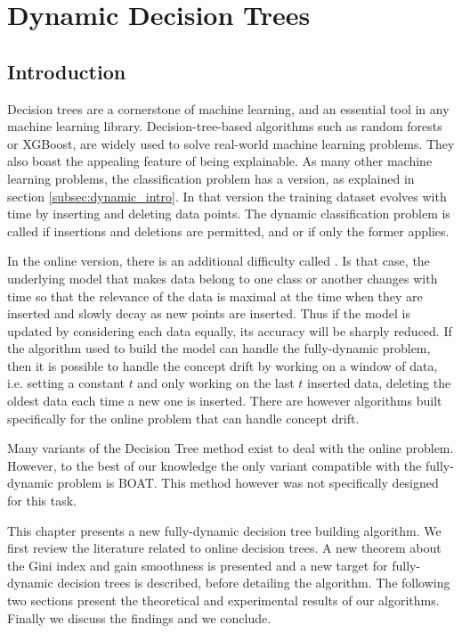 \chapter{Dynamic Decision Trees}
\section{Introduction}
Decision trees are a cornerstone of machine learning, and an essential tool in any machine learning library. Decision-tree-based algorithms such as random forests or XGBoost, are widely used to solve real-world machine learning problems. They also boast the appealing feature of being explainable.
As many other machine learning problems, the classification problem has a  version, as explained in section \ref{subsec:dynamic_intro}. In that version the training dataset evolves with time by inserting and deleting data points. The dynamic classification problem is called  if insertions and deletions are permitted, and  or  if only the former applies.

In the online version, there is an additional difficulty called . Is that case, the underlying model that makes data belong to one class or another changes with time so that the relevance of the data is maximal at the time when they are inserted and slowly decay as new points are inserted. Thus if the model is updated by considering each data equally, its accuracy will be sharply reduced. If the algorithm used to build the model can handle the fully-dynamic problem, then it is possible to handle the concept drift by working on a window of data, i.e. setting a constant $t$ and only working on the last $t$ inserted data, deleting the oldest data each time a new one is inserted. There are however algorithms built specifically for the online problem that can handle concept drift.

Many variants of the Decision Tree method exist to deal with the online problem. However, to the best of our knowledge the only variant compatible with the fully-dynamic problem is BOAT. This method however was not specifically designed for this task.

This chapter presents a new fully-dynamic decision tree building algorithm. We first review the literature related to online decision trees. A new theorem about the Gini index and gain smoothness is presented and a new target for fully-dynamic decision trees is described, before detailing the algorithm. The following two sections present the theoretical and experimental results of our algorithms. Finally we discuss the findings and we conclude.

